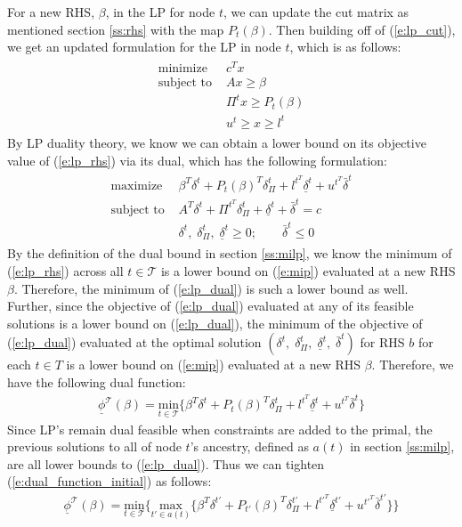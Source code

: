 \documentclass[10pt]{article}
\begin{document}
	For a new RHS, $ \beta $, in the LP for node $ t $, we can update the cut matrix as mentioned section \ref{ss:rhs} with the map $ P_t(\beta) $. Then building off of (\ref{e:lp_cut}), we get an updated formulation for the LP in node $ t $, which is as follows:
	\begin{align}
		\begin{split}
			\text{minimize } & c^T x \\
			\text{subject to } & Ax \geq \beta \\
			& \Pi^t x \geq P_t(\beta) \\
			& u^t \geq x \geq l^t
		\end{split} \label{e:lp_rhs}
	\end{align}
	By LP duality theory, we know we can obtain a lower bound on its objective value of (\ref{e:lp_rhs}) via its dual, which has the following formulation:
	\begin{align}
		\begin{split}
			\text{maximize } & \beta^T \delta^t + P_t(\beta)^T \delta_\Pi^t + l^{t^T} \underline{\delta}^t + u^{t^T} \bar{\delta}^t \\
			\text{subject to } & A^T \delta^t + \Pi^{t^T} \delta_\Pi^t + \underline{\delta}^t + \bar{\delta}^t = c \\
			& \delta^t, \; \delta_\Pi^t, \; \underline{\delta}^t \geq 0; \qquad \bar{\delta}^t \leq 0
		\end{split} \label{e:lp_dual}
	\end{align}
	By the definition of the dual bound in section \ref{ss:milp}, we know the minimum of (\ref{e:lp_rhs}) across all $ t \in \mathcal{T} $ is a lower bound on (\ref{e:mip}) evaluated at a new RHS $ \beta $. Therefore, the minimum of (\ref{e:lp_dual}) is such a lower bound as well. Further, since the objective of (\ref{e:lp_dual}) evaluated at any of its feasible solutions is a lower bound on (\ref{e:lp_dual}), the minimum of the objective of (\ref{e:lp_dual}) evaluated at the optimal solution $ (\delta^t, \; \delta_\Pi^t, \; \underline{\delta}^t, \; \bar{\delta}^t) $ for RHS $ b $ for each $ t \in T $ is a lower bound on (\ref{e:mip}) evaluated at a new RHS $ \beta $. Therefore, we have the following dual function:
	\begin{align}
		\underline{\phi}^\mathcal{T}(\beta) =  \underset{t \in \mathcal{T}}{\text{min}} \{\beta^T \delta^t + P_t(\beta)^T \delta_\Pi^t + l^{t^T} \underline{\delta}^t + u^{t^T} \bar{\delta}^t\} \label{e:dual_function_initial}
	\end{align}
	Since LP's remain dual feasible when constraints are added to the primal, the previous solutions to all of node $ t $'s ancestry, defined as $ a(t) $ in section \ref{ss:milp}, are all lower bounds to (\ref{e:lp_dual}). Thus we can tighten (\ref{e:dual_function_initial}) as follows:
	\begin{align}
		\underline{\phi}^\mathcal{T}(\beta) =  \underset{t \in \mathcal{T}}{\text{min}} \{ \underset{t' \in a(t)}{\text{max}} \{\beta^T \delta^{t'} + P_{t'}(\beta)^T \delta_\Pi^{t'} + l^{t'^T} \underline{\delta}^{t'} + u^{t'^T} \bar{\delta}^{t'} \} \} \label{e:dual_function}
	\end{align}
	
\end{document}
